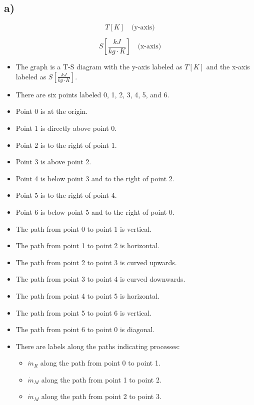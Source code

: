 

\subsection*{a)}

\[
T [K] \quad \text{(y-axis)}
\]

\[
S \left[ \frac{kJ}{kg \cdot K} \right] \quad \text{(x-axis)}
\]

\begin{itemize}
    \item The graph is a T-S diagram with the y-axis labeled as \( T [K] \) and the x-axis labeled as \( S \left[ \frac{kJ}{kg \cdot K} \right] \).
    \item There are six points labeled 0, 1, 2, 3, 4, 5, and 6.
    \item Point 0 is at the origin.
    \item Point 1 is directly above point 0.
    \item Point 2 is to the right of point 1.
    \item Point 3 is above point 2.
    \item Point 4 is below point 3 and to the right of point 2.
    \item Point 5 is to the right of point 4.
    \item Point 6 is below point 5 and to the right of point 0.
    \item The path from point 0 to point 1 is vertical.
    \item The path from point 1 to point 2 is horizontal.
    \item The path from point 2 to point 3 is curved upwards.
    \item The path from point 3 to point 4 is curved downwards.
    \item The path from point 4 to point 5 is horizontal.
    \item The path from point 5 to point 6 is vertical.
    \item The path from point 6 to point 0 is diagonal.
    \item There are labels along the paths indicating processes:
        \begin{itemize}
            \item \( \dot{m}_R \) along the path from point 0 to point 1.
            \item \( \dot{m}_M \) along the path from point 1 to point 2.
            \item \( \dot{m}_M \) along the path from point 2 to point 3.

\end{itemize}
\end{itemize}
